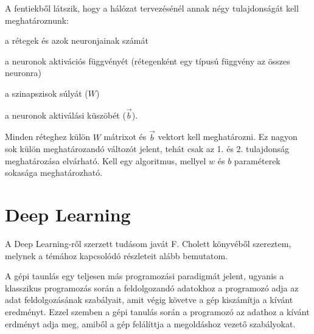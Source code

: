 A fentiekből látszik, hogy a hálózat tervezésénél annak négy tulajdonságát kell meghatároznunk:
\begin{enumerate*}
	\item a rétegek és azok neuronjainak számát
	\item a neuronok aktivációs függvényét (rétegenként egy típusú függvény az összes neuronra)
	\item a szinapszisok súlyát ($W$)
	\item a neuronok aktiválási küszöbét ($\vec{b}$).
\end{enumerate*}
Minden réteghez külön $W$ mátrixot és $\vec{b}$ vektort kell meghatározni. Ez nagyon sok külön meghatározandó változót jelent, tehát csak az 1. és 2. tulajdonság meghatározása elvárható. Kell egy algoritmus, mellyel $w$ és $b$ paraméterek sokasága meghatározható. %

\section{Deep Learning}
A Deep Learning-ről szerzett tudásom javát F. Cholett könyvéből\cite{Chollet} szereztem, melynek a témához kapcsolódó részleteit alább bemutatom.

A gépi taunlás egy teljesen más programozási paradigmát jelent, ugyanis a klasszikus programozás során a feldolgozandó adatokhoz a programozó adja az adat feldolgozásának szabályait, amit végig követve a gép kiszámítja a kívánt eredményt. Ezzel szemben a gépi tanulás során a programozó az adathoz  a kívánt erdményt adja meg, amiből a gép felálíttja a megoldáshoz vezető szabályokat.%

